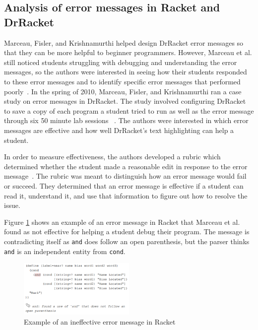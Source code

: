 \documentclass{sig-alternate}
\begin{document}
\subsection{Analysis of error messages in Racket and DrRacket}\label{subsec:racket analysis}
Marceau, Fisler, and Krishnamurthi helped design DrRacket error messages so that they can be more helpful to beginner programmers.
However, Marceau et al. still noticed students struggling with debugging and understanding the error messages, so the authors were interested in seeing how their students responded to these error messages and to identify specific error messages that performed poorly~\cite{Marceau:2011:MYL:2048237.2048241}.
In the spring of 2010, Marceau, Fisler, and Krishnamurthi ran a case study on error messages in DrRacket.
The study involved configuring DrRacket to save a copy of each program a student tried to run as well as the error message through six 50 minute lab sessions ~\cite{Marceau:2011:MEE:1953163.1953308}.
The authors were interested in which error messages are effective and how well DrRacket's text highlighting can help a student.  

In order to measure effectiveness, the authors developed a rubric which determined whether the student made a reasonable edit in response to the error message~\cite{Marceau:2011:MEE:1953163.1953308}.
The rubric was meant to distinguish how an error message would fail or succeed.
They determined that an error message is effective if a student can read it, understand it, and use that information to figure out how to resolve the issue.

Figure \ref{fig:racketerrormessage} shows an example of an error message in Racket that Marceau et al. found as not effective for helping a student debug their program.
The message is contradicting itself as \texttt{and} does follow an open parenthesis, but the parser thinks \texttt{and} is an independent entity from \texttt{cond}.

\begin{figure}[t!]
  \centering
  \includegraphics[keepaspectratio, width=0.5\textwidth]{MEE_example.png}
  \caption{Example of an ineffective error message in Racket}
  \label{fig:racketerrormessage}
\end{figure}
\end{document}
